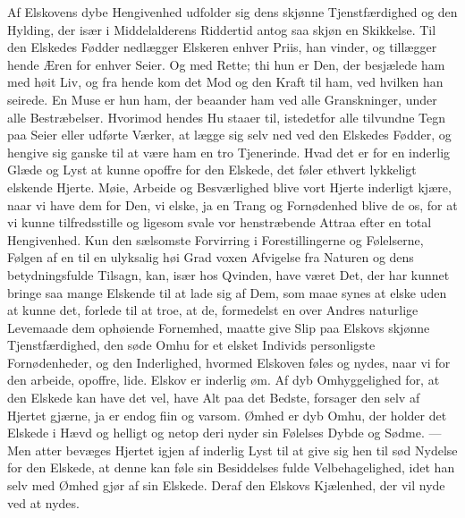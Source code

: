 \documentclass[12pt,a4paper]{book}
\newcommand{\apage}[1]{\marginnote{\footnotesize\textit{[#1]}}}
\begin{document}
Af Elskovens dybe Hengivenhed udfolder sig dens skjønne Tjenstfærdighed
og den Hylding, der især i Middelalderens Riddertid antog saa skjøn en
Skikkelse. Til den Elskedes Fødder nedlægger Elskeren enhver Priis, han
vinder, og tillægger hende Æren for enhver Seier. Og med Rette; thi hun
er Den, der besjælede ham med høit Liv, og fra hende kom det Mod og den
Kraft til ham, ved hvilken han seirede. En Muse er hun ham, der
beaander ham ved alle Granskninger, under alle Bestræbelser. Hvorimod
hendes Hu staaer til, istedetfor alle tilvundne Tegn paa Seier eller
udførte Værker, at lægge sig selv ned ved den Elskedes Fødder, og
hengive sig ganske til at være ham en tro Tjenerinde. Hvad det er for
en inderlig Glæde og Lyst at kunne opoffre for den Elskede, det føler
ethvert lykkeligt elskende Hjerte. Møie, Arbeide og Besværlighed blive
vort Hjerte inderligt kjære, naar vi have dem for Den, vi elske, ja en
Trang og Fornødenhed blive de os, for at vi kunne tilfredsstille og
ligesom svale vor henstræbende Attraa efter en total Hengivenhed. Kun
den sælsomste Forvirring i Forestillingerne og Følelserne, Følgen af en
til en ulyksalig høi Grad \apage{27} voxen Afvigelse fra Naturen og dens
betydningsfulde Tilsagn, kan, især hos Qvinden, have været Det, der har
kunnet bringe saa mange Elskende til at lade sig af Dem, som maae synes
at elske uden at kunne det, forlede til at troe, at de, formedelst en
over Andres naturlige Levemaade dem ophøiende Fornemhed, maatte give
Slip paa Elskovs skjønne Tjenstfærdighed, den søde Omhu for et elsket
Individs personligste Fornødenheder, og den Inderlighed, hvormed
Elskoven føles og nydes, naar vi for den arbeide, opoffre, lide. Elskov
er inderlig øm. Af dyb Omhyggelighed for, at den Elskede kan have det
vel, have Alt paa det Bedste, forsager den selv af Hjertet gjærne, ja er
endog fiin og varsom. Ømhed er dyb Omhu, der holder det Elskede i Hævd
og helligt og netop deri nyder sin Følelses Dybde og Sødme. --- Men
atter bevæges Hjertet igjen af inderlig Lyst til at give sig hen til
sød Nydelse for den Elskede, at denne kan føle sin Besiddelses fulde
Velbehagelighed, idet han selv med Ømhed gjør af sin Elskede. Deraf den
Elskovs Kjælenhed, der vil nyde ved at nydes.
\end{document}
